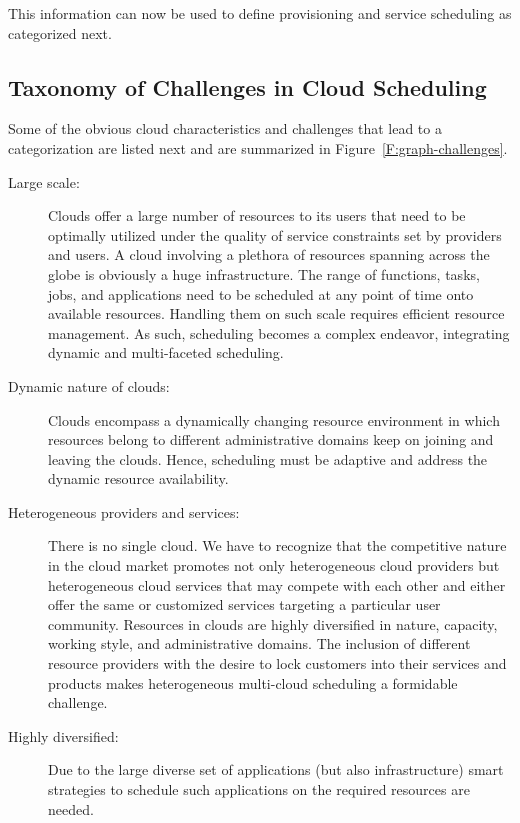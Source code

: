 \documentclass[final,5p,times,twocolumn]{elsarticle}
\begin{document}


This information can now be used to define provisioning and service scheduling as categorized next.

\subsection{Taxonomy of Challenges in Cloud Scheduling}\label{sec:challange}

Some of the obvious cloud characteristics and challenges that lead to a categorization are listed next and are summarized in Figure~\ref{F:graph-challenges}.

\begin{description}

\item [Large scale:] Clouds offer a large number of resources to its users that need to be optimally utilized under the quality of service constraints set by providers and users. A cloud involving a plethora of resources spanning across the globe is obviously a huge infrastructure. The range of functions, tasks, jobs, and applications need to be scheduled at any point of time onto available resources. Handling them on such scale requires efficient resource management. As such, scheduling becomes a complex endeavor, integrating dynamic and multi-faceted scheduling. 

\item [Dynamic nature of clouds:] Clouds encompass a dynamically changing resource environment in which resources belong to different administrative domains keep on joining and leaving the clouds. Hence, scheduling must be adaptive and address the dynamic resource availability.

\item[Heterogeneous providers and services:] There is no single cloud. We have to recognize that the competitive nature in the cloud market promotes not only heterogeneous cloud providers but heterogeneous cloud services that may compete with each other and either offer the same or customized services targeting a particular user community. Resources in clouds are highly diversified in nature, capacity, working style, and administrative domains. The inclusion of different resource providers with the desire to lock customers into their services and products makes heterogeneous multi-cloud scheduling a formidable challenge.

\item [Highly diversified:] Due to the large diverse set of applications (but also infrastructure) smart strategies to schedule such applications on the required resources are needed.


\end{description}
\end{document}
